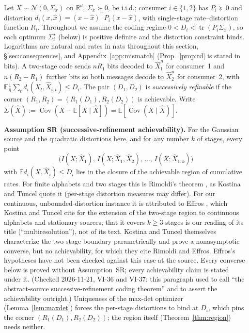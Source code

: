 \documentclass[11pt]{article}
\theoremstyle{definition}
\theoremstyle{remark}
\newcommand{\tr}{\operatorname{tr}}
\newcommand{\E}{\mathbb{E}}
\newcommand{\Cov}{\operatorname{Cov}}
\begin{document}
Let $X\sim\mathcal N(0,\Sigma_x)$ on $\mathbb R^d$, $\Sigma_x\succ0$, be i.i.d.; consumer
$i\in\{1,2\}$ has $P_i\succeq0$ and distortion $d_i(x,\hat x)=(x-\hat x)^\top P_i
(x-\hat x)$, with single-stage rate--distortion function $R_i$. Throughout we assume the
coding regime $0<D_i<\tr(P_i\Sigma_x)$, so each optimum $\Sigma_i^\star$ (below) is
positive definite and the distortion constraint binds. Logarithms are natural and rates in
nats throughout this section, \S\ref{sec:consequences}, and Appendix~\ref{app:mismatch}
(Prop.~\ref{prop:rd} is stated in bits). A two-stage code sends
$nR_1$ bits decoded to $\hat X_1^n$ for consumer~1 and $n(R_2-R_1)$ further bits so both
messages decode to $\hat X_2^n$ for consumer~2, with $\E\tfrac1n\sum_t d_i(X_t,\hat
X_{i,t})\le D_i$. The pair $(D_1,D_2)$ is \emph{successively refinable} if the corner
$(R_1,R_2)=(R_1(D_1),R_2(D_2))$ is achievable. Write $\Sigma(\hat X):=\Cov(X-\E[X\mid
\hat X])=\E[\Cov(X\mid\hat X)]$.

\smallskip\noindent\textbf{Assumption SR (successive-refinement achievability).} For the
Gaussian source and the quadratic distortions here, and for any number $k$ of stages,
every point
\[\bigl(I(X;\hat X_1),\,I(X;\hat X_1,\hat X_2),\,\dots,\,I(X;\hat X_{1:k})\bigr)\]
with $\E d_i(X,\hat X_i)\le D_i$ lies in the closure of the achievable region of cumulative
rates. For finite alphabets and two stages this is Rimoldi's theorem \cite{rimoldi}, as
Kostina and Tuncel quote it (per-stage distortion measures may differ). For our continuous,
unbounded-distortion instance it is attributed to Effros \cite{effros}, which Kostina and
Tuncel \cite{kostinatuncel} cite for the extension of the two-stage region to continuous
alphabets and stationary sources; that it covers $k\ge3$ stages is our reading of its
title (``multiresolution''), not of its text. Kostina and Tuncel themselves characterize
the two-stage boundary parametrically and prove a nonasymptotic converse, but no
achievability, for which they cite Rimoldi and Effros. Effros's hypotheses
have not been checked against this case at the source. Every converse below is proved
without Assumption~SR; every achievability claim is stated under it. (Checked 2026-11-21,
VI-36 and VI-37: this paragraph used to call \cite{kostinatuncel} ``the abstract-source
successive-refinement coding theorem'' and to assert the achievability outright.)
\smallskip Uniqueness of the max-det optimizer
(Lemma~\ref{lem:maxdet}) forces the per-stage distortions to bind at $D_i$, which pins the
corner $(R_1(D_1),R_2(D_2))$; the region itself (Theorem~\ref{thm:region}) needs neither.
\end{document}
